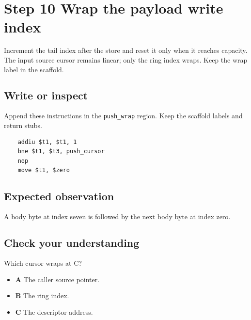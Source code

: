 \section{Step 10 Wrap the payload write index}\label{ring-s10}

Increment the tail index after the store and reset it only when it reaches capacity. The input source cursor remains linear; only the ring index wraps. Keep the wrap label in the scaffold.

\subsection{Write or inspect}
Append these instructions in the \texttt{push\_wrap} region. Keep the scaffold labels and return stubs.

\begin{verbatim}
    addiu $t1, $t1, 1
    bne $t1, $t3, push_cursor
    nop
    move $t1, $zero
\end{verbatim}

\subsection{Expected observation}
A body byte at index seven is followed by the next body byte at index zero.

\subsection{Check your understanding}
Which cursor wraps at C?

\begin{itemize}
  \item \textbf{A} The caller source pointer.
  \item \textbf{B} The ring index.
  \item \textbf{C} The descriptor address.
\end{itemize}
